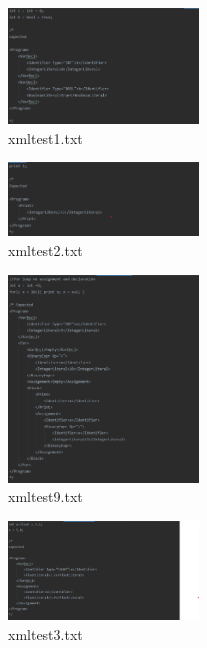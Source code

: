 \documentclass{article}
\begin{document}
					\begin{multicols}{2}
			
			
				\begin{figure}[H]
					\centering
			 			\includegraphics[width=0.45\textwidth]{xmltest1.png}
			 			\centering
			  			\caption{xmltest1.txt}
			  			\label{fig:xmltest1}
					\end{figure}
					
			\begin{figure}[H]
					\centering
			 			\includegraphics[width=0.45\textwidth]{xmltest2.png}
			 			\centering
			  			\caption{xmltest2.txt}
			  			\label{fig:xmltest2}
					\end{figure}
					
										
					\begin{figure}[H]
					\centering
			 			\includegraphics[width=0.45\textwidth]{xmltest9.png}
			 			\centering
			  			\caption{xmltest9.txt}
			  			\label{fig:xmltest9}
					\end{figure}
					

					
										
										\begin{figure}[H]
					\centering
			 			\includegraphics[width=0.45\textwidth]{xmltest3.png}
			 			\centering
			  			\caption{xmltest3.txt}
			  			\label{fig:xmltest3}
					\end{figure}
					

\end{multicols}
\end{document}
